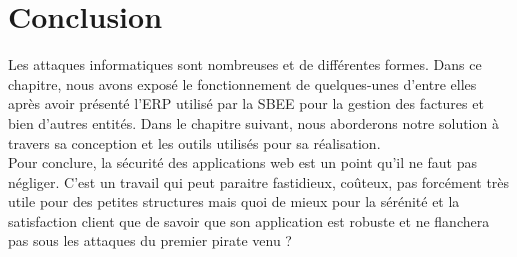 	  \newpage
	  \section*{Conclusion}
	    Les attaques informatiques sont nombreuses et de différentes formes. Dans ce chapitre, nous avons expos\'e le fonctionnement de quelques-unes d'entre elles apr\`es avoir   pr\'esent\'e l'ERP utilis\'e par la SBEE pour la gestion des factures et bien d'autres entit\'es. Dans le chapitre suivant, nous aborderons notre solution à travers sa conception et les outils utilisés pour sa réalisation.
	    \\Pour conclure, la sécurité des applications web est un point qu’il ne faut pas négliger. C’est un travail qui peut paraitre fastidieux, coûteux, pas forcément très utile pour des petites structures mais quoi de mieux pour la sérénité et la satisfaction client que de savoir que son application est robuste et ne flanchera pas sous les attaques du premier pirate venu ?
